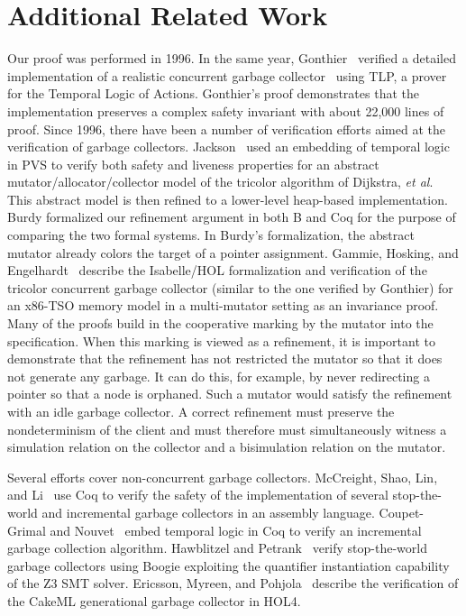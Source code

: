 
\section{Additional Related Work}
\label{sec:related-work}

Our proof was performed in 1996.  In the same year, 
Gonthier~\cite{gonthier1996verifying}
verified a detailed 
implementation of a realistic concurrent garbage collector~\cite{doligez1994portable} using TLP, a prover
for the Temporal Logic of Actions.  Gonthier's proof demonstrates 
that the implementation preserves a complex safety invariant 
with about 22,000 lines of proof.  Since 1996, there have been a
number of
verification efforts aimed at the verification of garbage collectors.
Jackson~\cite{jackson1998verifying} used an embedding of temporal logic in PVS to verify both
safety and liveness properties for an abstract
mutator/allocator/collector model of the tricolor algorithm of
Dijkstra, \emph{et al}.  This abstract model is then
refined to a lower-level heap-based implementation.  Burdy formalized
our refinement argument in both B and Coq for the purpose of comparing
the
two formal systems.  In Burdy's formalization, the abstract mutator
already colors the target of a pointer assignment.
Gammie, Hosking,
and Engelhardt~\cite{gammie2015relaxing} describe the Isabelle/HOL
formalization and verification of
the tricolor concurrent garbage 
collector (similar to the one verified by Gonthier) for an x86-TSO
memory model in a multi-mutator setting as an invariance proof.
Many of the proofs build in the cooperative marking by the mutator
into the specification.  When this marking is viewed as a refinement,
it
is important to demonstrate that the refinement has not restricted the
mutator so that it does not generate any garbage.  It can do this, for
example,
by never redirecting a pointer so that a node is orphaned.  Such a
mutator
would satisfy the refinement with an idle garbage collector.  A
correct
refinement must preserve the nondeterminism of the client and must
therefore must simultaneously witness a simulation relation on the
collector and a bisimulation
relation on the mutator.  

Several efforts cover non-concurrent garbage collectors.  McCreight,
Shao, Lin, and Li~\cite{mccreight2007general} use Coq to
verify the safety of the implementation of several
stop-the-world and incremental garbage collectors in an assembly
language.  Coupet-Grimal and Nouvet~\cite{8133460} embed temporal
logic in Coq to verify an incremental garbage collection algorithm.
Hawblitzel and Petrank~\cite{hawblitzel2009automated} verify stop-the-world garbage collectors using
Boogie exploiting the quantifier instantiation capability of the Z3
SMT solver. Ericsson, Myreen, and Pohjola~\cite{ericsson2017verified}
describe the verification of
the CakeML generational garbage collector in HOL4.



